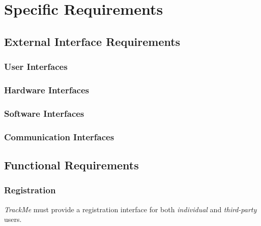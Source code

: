 \documentclass[a4paper]{article}
\begin{document}
\section{Specific Requirements}

    \subsection{External Interface Requirements}
        
        \subsubsection{User Interfaces}
        
        \subsubsection{Hardware Interfaces}
        
        \subsubsection{Software Interfaces}
        
        \subsubsection{Communication Interfaces}
    
    \subsection{Functional Requirements}
        
        \subsubsection{Registration}
        \textit{TrackMe} must provide a registration interface for both \textit{individual} and \textit{third-party} users.
        
\end{document}
